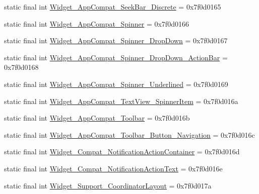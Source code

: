 \begin{DoxyCompactItemize}
static final int \mbox{\hyperlink{classcom_1_1synnapps_1_1carouselview_1_1_r_1_1style_a83ab38537f6dcb5b7f6e417ea2a8f52e}{Widget\+\_\+\+App\+Compat\+\_\+\+Seek\+Bar\+\_\+\+Discrete}} = 0x7f0d0165
\item 
static final int \mbox{\hyperlink{classcom_1_1synnapps_1_1carouselview_1_1_r_1_1style_a05ddc9b6abac3b5a7fbbf9c18c5662f8}{Widget\+\_\+\+App\+Compat\+\_\+\+Spinner}} = 0x7f0d0166
\item 
static final int \mbox{\hyperlink{classcom_1_1synnapps_1_1carouselview_1_1_r_1_1style_a5616d7a35639568c4742c3ae70064125}{Widget\+\_\+\+App\+Compat\+\_\+\+Spinner\+\_\+\+Drop\+Down}} = 0x7f0d0167
\item 
static final int \mbox{\hyperlink{classcom_1_1synnapps_1_1carouselview_1_1_r_1_1style_af8599a406feb3fe665ea93431b3e7b2e}{Widget\+\_\+\+App\+Compat\+\_\+\+Spinner\+\_\+\+Drop\+Down\+\_\+\+Action\+Bar}} = 0x7f0d0168
\item 
static final int \mbox{\hyperlink{classcom_1_1synnapps_1_1carouselview_1_1_r_1_1style_ad844ebffba3c3d02b900d39ca7257a05}{Widget\+\_\+\+App\+Compat\+\_\+\+Spinner\+\_\+\+Underlined}} = 0x7f0d0169
\item 
static final int \mbox{\hyperlink{classcom_1_1synnapps_1_1carouselview_1_1_r_1_1style_a4ff6f40577ed14b7af842b7782bce460}{Widget\+\_\+\+App\+Compat\+\_\+\+Text\+View\+\_\+\+Spinner\+Item}} = 0x7f0d016a
\item 
static final int \mbox{\hyperlink{classcom_1_1synnapps_1_1carouselview_1_1_r_1_1style_abd959dc9652c5a80ee5d8f95a368426b}{Widget\+\_\+\+App\+Compat\+\_\+\+Toolbar}} = 0x7f0d016b
\item 
static final int \mbox{\hyperlink{classcom_1_1synnapps_1_1carouselview_1_1_r_1_1style_a53880e78987740baabd9b0840ff7aaa3}{Widget\+\_\+\+App\+Compat\+\_\+\+Toolbar\+\_\+\+Button\+\_\+\+Navigation}} = 0x7f0d016c
\item 
static final int \mbox{\hyperlink{classcom_1_1synnapps_1_1carouselview_1_1_r_1_1style_a94c5ca51a2c33402c70ffca3e5bdcc9d}{Widget\+\_\+\+Compat\+\_\+\+Notification\+Action\+Container}} = 0x7f0d016d
\item 
static final int \mbox{\hyperlink{classcom_1_1synnapps_1_1carouselview_1_1_r_1_1style_ab86050cd389ebdcb6cc1c53ea9475c4d}{Widget\+\_\+\+Compat\+\_\+\+Notification\+Action\+Text}} = 0x7f0d016e
\item 
static final int \mbox{\hyperlink{classcom_1_1synnapps_1_1carouselview_1_1_r_1_1style_a3279bb60dd19b752e8d06c67993ea196}{Widget\+\_\+\+Support\+\_\+\+Coordinator\+Layout}} = 0x7f0d017a
\end{DoxyCompactItemize}

